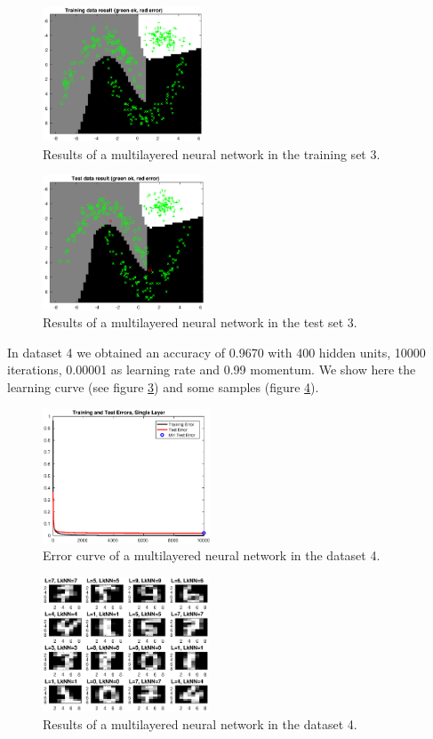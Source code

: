 \documentclass{article}
\begin{document}
\begin{figure}[!htb]
\centering
\includegraphics[height=4cm]{images/multi_data3_result_train}
\caption{Results of a multilayered neural network in the training set 3.}
\label{fig:multi_data3_result_train}
\end{figure}

\begin{figure}[!htb]
\centering
\includegraphics[height=4cm]{images/multi_data3_result_test}
\caption{Results of a multilayered neural network in the test set 3.}
\label{fig:multi_data3_result_test}
\end{figure}


In dataset 4 we obtained an accuracy of 0.9670 with 400 hidden units, 10000 iterations, 0.00001 as learning rate and 0.99 momentum. We show here the learning curve (see figure \ref{fig:multi_data4_error}) and some samples (figure \ref{fig:multi_data4_result}).

\begin{figure}[!htb]
\centering
\includegraphics[height=4cm]{images/multi_data4_error}
\caption{Error curve of a multilayered neural network in the dataset 4.}
\label{fig:multi_data4_error}
\end{figure}

\begin{figure}[!htb]
\centering
\includegraphics[height=4cm]{images/multi_data4_result}
\caption{Results of a multilayered neural network in the dataset 4.}
\label{fig:multi_data4_result}
\end{figure}
\end{document}
